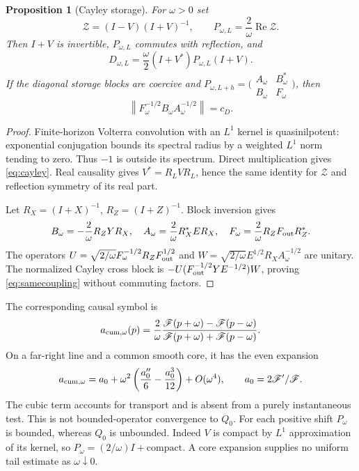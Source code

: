 \documentclass[11pt]{article}
\newtheorem{proposition}[theorem]{Proposition}
\theoremstyle{remark}\newtheorem{remark}[theorem]{Remark}
\newcommand{\Rea}{\operatorname{Re}}
\newcommand{\norm}[1]{\left\|#1\right\|}
\begin{document}
\begin{proposition}[Cayley storage]\label{prop:cayley}
For $\omega>0$ set
\[
 \mathcal Z=(I-V)(I+V)^{-1},\qquad
 P_{\omega,L}=\frac2\omega\Rea\mathcal Z.
\]
Then $I+V$ is invertible, $P_{\omega,L}$ commutes with reflection, and
\begin{equation}\label{eq:cayley}
 D_{\omega,L}=\frac\omega2(I+V^*)P_{\omega,L}(I+V).
\end{equation}
If the diagonal storage blocks are coercive and
$P_{\omega,L+h}=\bigl(\begin{smallmatrix}A_\omega&B_\omega^*\\B_\omega&F_\omega\end{smallmatrix}\bigr)$, then
\begin{equation}\label{eq:samecoupling}
 \norm{F_\omega^{-1/2}B_\omega A_\omega^{-1/2}}=c_D.
\end{equation}
\end{proposition}
\begin{proof}
Finite-horizon Volterra convolution with an $L^1$ kernel is quasinilpotent: exponential conjugation bounds its spectral radius by a weighted $L^1$ norm tending to zero. Thus $-1$ is outside its spectrum. Direct multiplication gives \eqref{eq:cayley}. Real causality gives $V^*=R_LVR_L$, hence the same identity for $\mathcal Z$ and reflection symmetry of its real part.

Let $R_X=(I+X)^{-1}$, $R_Z=(I+Z)^{-1}$. Block inversion gives
\[
 B_\omega=-\frac2\omega R_ZYR_X,\quad
 A_\omega=\frac2\omega R_X^*ER_X,\quad
 F_\omega=\frac2\omega R_ZF_{\rm out}R_Z^*.
\]
The operators
$U=\sqrt{2/\omega}F_\omega^{-1/2}R_ZF_{\rm out}^{1/2}$ and
$W=\sqrt{2/\omega}E^{1/2}R_XA_\omega^{-1/2}$ are unitary. The normalized Cayley cross block is $-U(F_{\rm out}^{-1/2}YE^{-1/2})W$, proving \eqref{eq:samecoupling} without commuting factors.
\end{proof}

The corresponding causal symbol is
\[
 a_{\rm cum,\omega}(p)=\frac2\omega
 \frac{\mathscr F(p+\omega)-\mathscr F(p-\omega)}
 {\mathscr F(p+\omega)+\mathscr F(p-\omega)}.
\]
On a far-right line and a common smooth core, it has the even expansion
\begin{equation}\label{eq:cumseries}
 a_{\rm cum,\omega}=a_0+\omega^2\left(\frac{a_0''}{6}-\frac{a_0^3}{12}\right)+O(\omega^4),
 \qquad a_0=2\mathscr F'/\mathscr F.
\end{equation}
The cubic term accounts for transport and is absent from a purely instantaneous test. This is not bounded-operator convergence to $Q_0$. For each positive shift $P_\omega$ is bounded, whereas $Q_0$ is unbounded. Indeed $V$ is compact by $L^1$ approximation of its kernel, so $P_\omega=(2/\omega)I+\text{compact}$. A core expansion supplies no uniform tail estimate as $\omega\downarrow0$.
\end{document}
